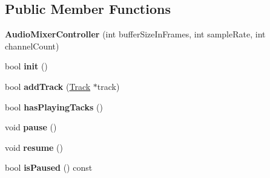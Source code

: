 \subsection*{Public Member Functions}
\begin{DoxyCompactItemize}
\item 
\mbox{\label{classcocos2d_1_1experimental_1_1AudioMixerController_a32eb2831c1978e4dabaa633402f47d5b}} 
{\bfseries Audio\+Mixer\+Controller} (int buffer\+Size\+In\+Frames, int sample\+Rate, int channel\+Count)
\item 
\mbox{\label{classcocos2d_1_1experimental_1_1AudioMixerController_a28f8b1f80258369f22a281adb1bef076}} 
bool {\bfseries init} ()
\item 
\mbox{\label{classcocos2d_1_1experimental_1_1AudioMixerController_adec7fcd01db52af59fe6c8d02b0f615c}} 
bool {\bfseries add\+Track} (\hyperlink{classcocos2d_1_1experimental_1_1Track}{Track} $\ast$track)
\item 
\mbox{\label{classcocos2d_1_1experimental_1_1AudioMixerController_ac71e108a99a327ce66e105a106ad167c}} 
bool {\bfseries has\+Playing\+Tacks} ()
\item 
\mbox{\label{classcocos2d_1_1experimental_1_1AudioMixerController_ad5cbb74212f41d2d1c1fa291e7093fa6}} 
void {\bfseries pause} ()
\item 
\mbox{\label{classcocos2d_1_1experimental_1_1AudioMixerController_a9e908cb2c56dac7dcf0d541fcdcf931e}} 
void {\bfseries resume} ()
\item 
\mbox{\label{classcocos2d_1_1experimental_1_1AudioMixerController_ad4c27ec821a52f38f389ba9cf7fd75c7}} 
bool {\bfseries is\+Paused} () const
\item 
\mbox{\label{classcocos2d_1_1experimental_1_1AudioMixerController_ace9230c02ef344018bbc158355133bdb}} 

\end{DoxyCompactItemize}
